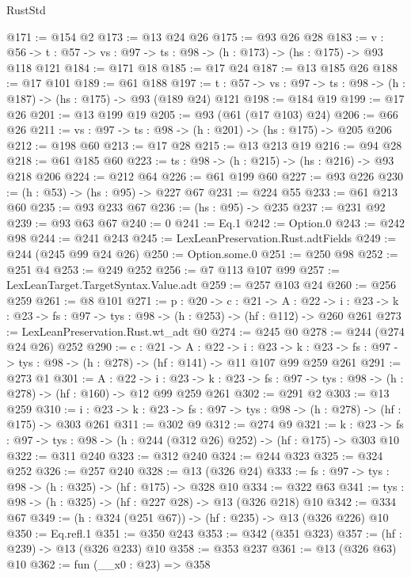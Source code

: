 \begin{lexlean}{RustStd}
\begin{coremodule}
@171 := @154 @2
@173 := @13 @24 @26
@175 := @93 @26 @28
@183 := {v : @56} ->
  {t : @57} -> {vs : @97} -> {ts : @98} -> (h : @173) -> (hs : @175) -> @93 @118 @121
@184 := @171 @18
@185 := @17 @24
@187 := @13 @185 @26
@188 := @17 @101
@189 := @61 @188
@197 := {t : @57} -> {vs : @97} -> {ts : @98} -> (h : @187) -> (hs : @175) -> @93 (@189 @24) @121
@198 := @184 @19
@199 := @17 @26
@201 := @13 @199 @19
@205 := @93 (@61 (@17 @103) @24)
@206 := @66 @26
@211 := {vs : @97} -> {ts : @98} -> (h : @201) -> (hs : @175) -> @205 @206
@212 := @198 @60
@213 := @17 @28
@215 := @13 @213 @19
@216 := @94 @28
@218 := @61 @185 @60
@223 := {ts : @98} -> (h : @215) -> (hs : @216) -> @93 @218 @206
@224 := @212 @64
@226 := @61 @199 @60
@227 := @93 @226
@230 := (h : @53) -> (hs : @95) -> @227 @67
@231 := @224 @55
@233 := @61 @213 @60
@235 := @93 @233 @67
@236 := (hs : @95) -> @235
@237 := @231 @92
@239 := @93 @63 @67
@240 := 0
@241 := Eq.{1}
@242 := Option.{0}
@243 := @242 @98
@244 := @241 @243
@245 := LexLeanPreservation.Rust.adtFields
@249 := @244 (@245 @99 @24 @26)
@250 := Option.some.{0}
@251 := @250 @98
@252 := @251 @4
@253 := @249 @252
@256 := @7 @113 @107 @99
@257 := LexLeanTarget.TargetSyntax.Value.adt
@259 := @257 @103 @24
@260 := @256 @259
@261 := @8 @101
@271 := {p : @20} ->
  {c : @21} ->
  {A : @22} ->
  {i : @23} -> {k : @23} -> {fs : @97} -> {tys : @98} -> (h : @253) -> (hf : @112) -> @260 @261
@273 := LexLeanPreservation.Rust.wt_adt @0
@274 := @245 @0
@278 := @244 (@274 @24 @26) @252
@290 := {c : @21} ->
  {A : @22} ->
  {i : @23} ->
  {k : @23} -> {fs : @97} -> {tys : @98} -> (h : @278) -> (hf : @141) -> @11 @107 @99 @259 @261
@291 := @273 @1
@301 := {A : @22} ->
  {i : @23} ->
  {k : @23} -> {fs : @97} -> {tys : @98} -> (h : @278) -> (hf : @160) -> @12 @99 @259 @261
@302 := @291 @2
@303 := @13 @259
@310 := {i : @23} ->
  {k : @23} -> {fs : @97} -> {tys : @98} -> (h : @278) -> (hf : @175) -> @303 @261
@311 := @302 @9
@312 := @274 @9
@321 := {k : @23} ->
  {fs : @97} -> {tys : @98} -> (h : @244 (@312 @26) @252) -> (hf : @175) -> @303 @10
@322 := @311 @240
@323 := @312 @240
@324 := @244 @323
@325 := @324 @252
@326 := @257 @240
@328 := @13 (@326 @24)
@333 := {fs : @97} -> {tys : @98} -> (h : @325) -> (hf : @175) -> @328 @10
@334 := @322 @63
@341 := {tys : @98} -> (h : @325) -> (hf : @227 @28) -> @13 (@326 @218) @10
@342 := @334 @67
@349 := (h : @324 (@251 @67)) -> (hf : @235) -> @13 (@326 @226) @10
@350 := Eq.refl.{1}
@351 := @350 @243
@353 := @342 (@351 @323)
@357 := (hf : @239) -> @13 (@326 @233) @10
@358 := @353 @237
@361 := @13 (@326 @63) @10
@362 := fun (__x0 : @23) => @358

\end{coremodule}
\end{lexlean}
